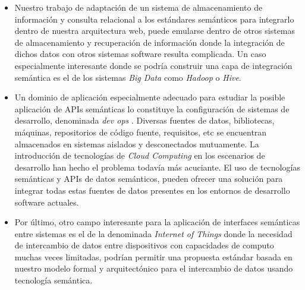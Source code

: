 \begin{itemize}
  \item Nuestro trabajo de adaptaci\'on de un sistema de almacenamiento de informaci\'on y consulta relacional a los est\'andares sem\'anticos para integrarlo dentro de nuestra arquitectura web, puede emularse dentro de otros sistemas de almacenamiento y recuperaci\'on de informaci\'on donde la integraci\'on de dichos datos con otros sistemas software resulta complicada. Un caso especialmente interesante donde se podr\'ia construir una capa de integraci\'on sem\'antica es el de los sistemas \textit{Big Data} como \textit{Hadoop} o \textit{Hive}.
  \item Un dominio de aplicaci\'on especialmente adecuado para estudiar la posible aplicaci\'on de APIs sem\'anticas lo constituye la configuraci\'on de sistemas de desarrollo, denominada \textit{dev ops} \cite{smith2011hype}. Diversas fuentes de datos, bibliotecas, m\'aquinas, repositorios de c\'odigo fuente, requisitos, etc se encuentran almacenados en sistemas aislados y desconectados mutuamente. La introducci\'on de tecnolog\'ias de \textit{Cloud Computing} en los escenarios de desarrollo han hecho el problema todav\'ia m\'as acuciante. El uso de tecnolog\'ias sem\'anticas y APIs de datos sem\'anticos, pueden ofrecer una soluci\'on para integrar todas estas fuentes de datos presentes en los entornos de desarrollo software actuales.

  \item Por \'ultimo, otro campo interesante para la aplicaci\'on de interfaces sem\'anticas entre sistemas es el de la denominada \textit{Internet of Things} donde la necesidad de intercambio de datos entre dispositivos con capacidades de computo muchas veces limitadas, podr\'ian permitir una propuesta est\'andar basada en nuestro modelo formal y arquitect\'onico para el intercambio de datos usando tecnolog\'ia sem\'antica.
\end{itemize}